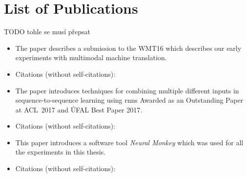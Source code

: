 \chapter*{List of Publications}

TODO tohle se musí přepsat



\noindent{}
\begin{itemize}[noitemsep,topsep=0pt]

    \item The paper describes a submission to the WMT16 which describes our early
        experiments with multimodal machine translation.

    \item Citations (without self-citations): 

\end{itemize}\vspace{3mm}


\noindent{}
\begin{itemize}[noitemsep,topsep=0pt]

\item The paper introduces techniques for combining multiple different inputs
  in sequence-to-sequence learning using \acp{rnn} Awarded as an Outstanding
  Paper at ACL~2017 and ÚFAL Best Paper 2017.

  \item Citations (without self-citations): 

\end{itemize}\vspace{3mm}


\noindent{}
\begin{itemize}[noitemsep,topsep=0pt]

  \item This paper introduces a software tool \emph{Neural Monkey} which was
      used for all the experiments in this thesis.

  \item Citations (without self-citations): 

\end{itemize}\vspace{3mm}

